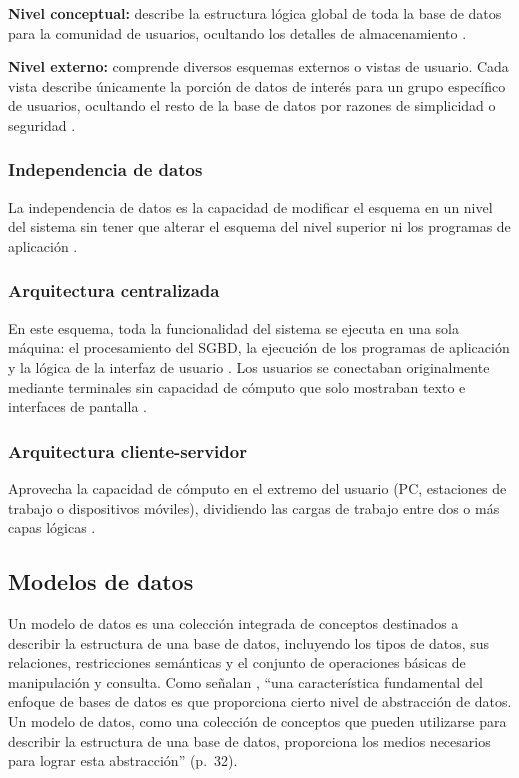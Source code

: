 \textbf{Nivel conceptual:} describe la estructura lógica global de toda la base de datos para la comunidad de usuarios, ocultando los detalles de almacenamiento \parencite[p.~37]{elmasri_navathe}.

\textbf{Nivel externo:} comprende diversos esquemas externos o vistas de usuario. Cada vista describe únicamente la porción de datos de interés para un grupo específico de usuarios, ocultando el resto de la base de datos por razones de simplicidad o seguridad \parencite[p.~37]{elmasri_navathe}.

\subsubsection{Independencia de datos}

La independencia de datos es la capacidad de modificar el esquema en un nivel del sistema sin tener que alterar el esquema del nivel superior ni los programas de aplicación \parencites[pp.~37--38]{elmasri_navathe}[p.~4]{silberschatz_dbconcepts}.

\subsubsection{Arquitectura centralizada}

En este esquema, toda la funcionalidad del sistema se ejecuta en una sola máquina: el procesamiento del SGBD, la ejecución de los programas de aplicación y la lógica de la interfaz de usuario \parencite[pp.~46--47]{elmasri_navathe}. Los usuarios se conectaban originalmente mediante terminales sin capacidad de cómputo que solo mostraban texto e interfaces de pantalla \parencite[p.~46]{elmasri_navathe}.

\subsubsection{Arquitectura cliente-servidor}

Aprovecha la capacidad de cómputo en el extremo del usuario (PC, estaciones de trabajo o dispositivos móviles), dividiendo las cargas de trabajo entre dos o más capas lógicas \parencite[p.~47]{elmasri_navathe}.

\subsection{Modelos de datos}

Un modelo de datos es una colección integrada de conceptos destinados a describir la estructura de una base de datos, incluyendo los tipos de datos, sus relaciones, restricciones semánticas y el conjunto de operaciones básicas de manipulación y consulta. Como señalan \textcite{elmasri_navathe}, \enquote{una característica fundamental del enfoque de bases de datos es que proporciona cierto nivel de abstracción de datos. Un modelo de datos, como una colección de conceptos que pueden utilizarse para describir la estructura de una base de datos, proporciona los medios necesarios para lograr esta abstracción} (p.~32).

